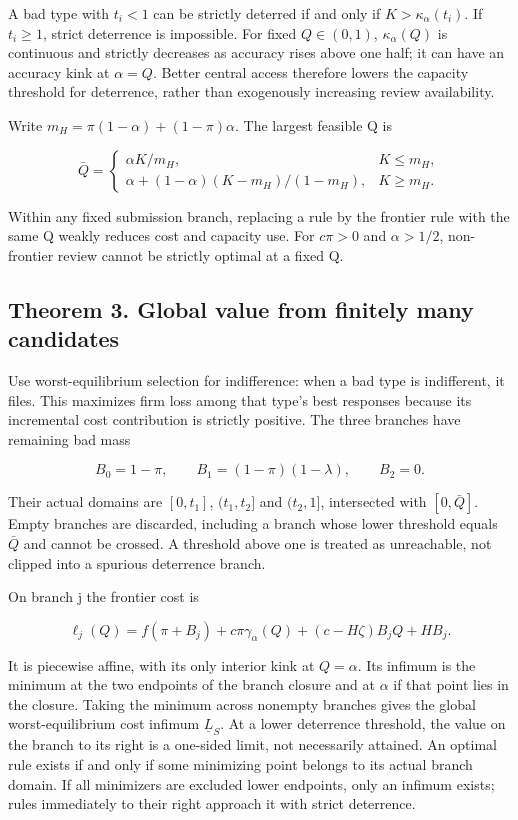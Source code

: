 \documentclass[
  11pt,
]{article}
\begin{document}
A bad type with \(t_i<1\) can be strictly deterred if and only if
\(K>\kappa_\alpha(t_i)\). If \(t_i\geq1\), strict deterrence is
impossible. For fixed \(Q\in(0,1)\), \(\kappa_\alpha(Q)\) is continuous
and strictly decreases as accuracy rises above one half; it can have an
accuracy kink at \(\alpha=Q\). Better central access therefore lowers
the capacity threshold for deterrence, rather than exogenously
increasing review availability.

Write \(m_H=\pi(1-\alpha)+(1-\pi)\alpha\). The largest feasible Q is

\[\bar Q=
\begin{cases}
\alpha K/m_H,&K\leq m_H,\\
\alpha+(1-\alpha)(K-m_H)/(1-m_H),&K\geq m_H.
\end{cases} \tag{5}\]

Within any fixed submission branch, replacing a rule by the frontier
rule with the same Q weakly reduces cost and capacity use. For
\(c\pi>0\) and \(\alpha>1/2\), non-frontier review cannot be strictly
optimal at a fixed Q.

\subsection{Theorem 3. Global value from finitely many
candidates}\label{theorem-3.-global-value-from-finitely-many-candidates}

Use worst-equilibrium selection for indifference: when a bad type is
indifferent, it files. This maximizes firm loss among that type's best
responses because its incremental cost contribution is strictly
positive. The three branches have remaining bad mass

\[B_0=1-\pi,\qquad B_1=(1-\pi)(1-\lambda),\qquad B_2=0.\]

Their actual domains are \([0,t_1]\), \((t_1,t_2]\) and \((t_2,1]\),
intersected with \([0,\bar Q]\). Empty branches are discarded, including
a branch whose lower threshold equals \(\bar Q\) and cannot be crossed.
A threshold above one is treated as unreachable, not clipped into a
spurious deterrence branch.

On branch j the frontier cost is

\[\ell_j(Q)=f(\pi+B_j)+c\pi\gamma_\alpha(Q)+(c-H\zeta)B_jQ+HB_j. \tag{6}\]

It is piecewise affine, with its only interior kink at \(Q=\alpha\). Its
infimum is the minimum at the two endpoints of the branch closure and at
\(\alpha\) if that point lies in the closure. Taking the minimum across
nonempty branches gives the global worst-equilibrium cost infimum
\(\underline L_S\). At a lower deterrence threshold, the value on the
branch to its right is a one-sided limit, not necessarily attained. An
optimal rule exists if and only if some minimizing point belongs to its
actual branch domain. If all minimizers are excluded lower endpoints,
only an infimum exists; rules immediately to their right approach it
with strict deterrence.
\end{document}
